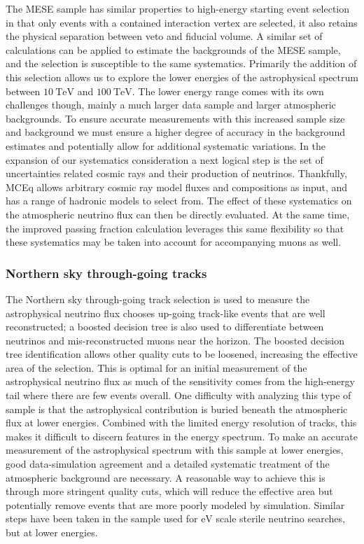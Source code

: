 The MESE sample has similar properties to high-energy starting event selection in that only events with a contained interaction vertex are selected, it also retains the physical separation between veto and fiducial volume.
A similar set of calculations can be applied to estimate the backgrounds of the MESE sample, and the selection is susceptible to the same systematics.
Primarily the addition of this selection allows us to explore the lower energies of the astrophysical spectrum between $\SI{10}\TeV$ and $\SI{100}\TeV$.
The lower energy range comes with its own challenges though, mainly a much larger data sample and larger atmospheric backgrounds.
To ensure accurate measurements with this increased sample size and background we must ensure a higher degree of accuracy in the background estimates and potentially allow for additional systematic variations.
In the expansion of our systematics consideration a next logical step is the set of uncertainties related cosmic rays and their production of neutrinos.
Thankfully, MCEq allows arbitrary cosmic ray model fluxes and compositions as input, and has a range of hadronic models to select from. The effect of these systematics on the atmospheric neutrino flux can then be directly evaluated.
At the same time, the improved passing fraction calculation leverages this same flexibility so that these systematics may be taken into account for accompanying muons as well.

\subsubsection{Northern sky through-going tracks}
The Northern sky through-going track selection is used to measure the astrophysical neutrino flux chooses up-going track-like events that are well reconstructed; a boosted decision tree is also used to differentiate between neutrinos and mis-reconstructed muons near the horizon.
The boosted decision tree identification allows other quality cuts to be loosened, increasing the effective area of the selection.
This is optimal for an initial measurement of the astrophysical neutrino flux as much of the sensitivity comes from the high-energy tail where there are few events overall.
One difficulty with analyzing this type of sample is that the astrophysical contribution is buried beneath the atmospheric flux at lower energies.
Combined with the limited energy resolution of tracks, this makes it difficult to discern features in the energy spectrum.
To make an accurate measurement of the astrophysical spectrum with this sample at lower energies, good data-simulation agreement and a detailed systematic treatment of the atmospheric background are necessary.
A reasonable way to achieve this is through more stringent quality cuts, which will reduce the effective area but potentially remove events that are more poorly modeled by simulation.
Similar steps have been taken in the sample used for $\si\eV$ scale sterile neutrino searches, but at lower energies.

